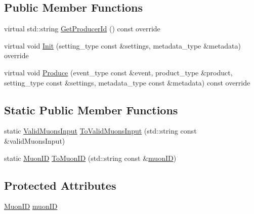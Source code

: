 \subsection*{Public Member Functions}
\begin{DoxyCompactItemize}
\item 
virtual std::string \hyperlink{classTagAndProbeMuonPairProducer_ae1f2dcdf85b71e242238c980b33fe8f0}{GetProducerId} () const override
\item 
virtual void \hyperlink{classTagAndProbeMuonPairProducer_a151e1f7a4f0b0b35102b56d1e8cf6fc3}{Init} (setting\_\-type const \&settings, metadata\_\-type \&metadata) override
\item 
virtual void \hyperlink{classTagAndProbeMuonPairProducer_a57e3e80a55930317c0cdfbd10fd81a39}{Produce} (event\_\-type const \&event, product\_\-type \&product, setting\_\-type const \&settings, metadata\_\-type const \&metadata) const override
\end{DoxyCompactItemize}
\subsection*{Static Public Member Functions}
\begin{DoxyCompactItemize}
\item 
static \hyperlink{classTagAndProbeMuonPairProducer_adaf024ea8e217bd1e93cb4193768701d}{ValidMuonsInput} \hyperlink{classTagAndProbeMuonPairProducer_a9ef91549235c69471c608919c33483dd}{ToValidMuonsInput} (std::string const \&validMuonsInput)
\item 
static \hyperlink{classTagAndProbeMuonPairProducer_a60f9e6b1f42c503ba52f0cdf54fb8455}{MuonID} \hyperlink{classTagAndProbeMuonPairProducer_aab5bed4d0e300d632d68ba3a93c3ea64}{ToMuonID} (std::string const \&\hyperlink{classTagAndProbeMuonPairProducer_a9a517b5e47d31b7f6c5343d670ec0f3f}{muonID})
\end{DoxyCompactItemize}
\subsection*{Protected Attributes}
\begin{DoxyCompactItemize}
\item 
\hyperlink{classTagAndProbeMuonPairProducer_a60f9e6b1f42c503ba52f0cdf54fb8455}{MuonID} \hyperlink{classTagAndProbeMuonPairProducer_a9a517b5e47d31b7f6c5343d670ec0f3f}{muonID}
\end{DoxyCompactItemize}


